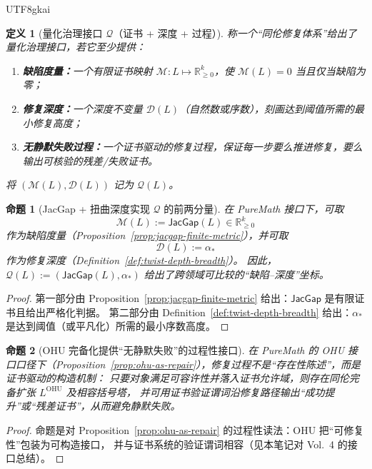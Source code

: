 \documentclass[12pt]{article}
\newtheorem{definition}{定义}[section]
\newtheorem{proposition}{命题}[section]
\newcommand{\JacGap}{\ensuremath{\mathsf{JacGap}}}
\begin{document}
\begin{CJK*}{UTF8}{gkai}
\begin{definition}[量化治理接口 $\mathcal{Q}$（证书 + 深度 + 过程）]
\label{def:quantitative-governance-interface}
称一个“同伦修复体系”给出了量化治理接口，若它至少提供：
\begin{enumerate}
  \item \textbf{缺陷度量：}一个有限证书映射 $\mathcal{M}:L\mapsto \mathbb{R}_{\ge0}^k$，使 $\mathcal{M}(L)=0$ 当且仅当缺陷为零；
  \item \textbf{修复深度：}一个深度不变量 $\mathcal{D}(L)$（自然数或序数），刻画达到阈值所需的最小修复高度；
  \item \textbf{无静默失败过程：}一个证书驱动的修复过程，保证每一步要么推进修复，要么输出可核验的残差/失败证书。
\end{enumerate}
将 $(\mathcal{M}(L),\mathcal{D}(L))$ 记为 $\mathcal{Q}(L)$。
\end{definition}

\begin{proposition}[JacGap + 扭曲深度实现 $\mathcal{Q}$ 的前两分量]
\label{prop:Q-metric-depth}
在 PureMath 接口下，可取
\[
  \mathcal{M}(L):=\JacGap(L)\in\mathbb{R}_{\ge0}^k
\]
作为缺陷度量（Proposition~\ref{prop:jacgap-finite-metric}），并可取
\[
  \mathcal{D}(L):=\alpha_\ast
\]
作为修复深度（Definition~\ref{def:twist-depth-breadth}）。
因此，$\mathcal{Q}(L):=(\JacGap(L),\alpha_\ast)$ 给出了跨领域可比较的“缺陷--深度”坐标。%
\cite{GaoZheng2025GFramework,JacGapDStructureEquiv}
\end{proposition}

\begin{proof}
第一部分由 Proposition~\ref{prop:jacgap-finite-metric} 给出：$\JacGap$ 是有限证书且给出严格化判据。
第二部分由 Definition~\ref{def:twist-depth-breadth} 给出：$\alpha_\ast$ 是达到阈值（或平凡化）所需的最小序数高度。
\end{proof}

\begin{proposition}[OHU 完备化提供“无静默失败”的过程性接口]
\label{prop:Q-failure-free}
在 PureMath 的 OHU 接口口径下（Proposition~\ref{prop:ohu-as-repair}），修复过程不是“存在性陈述”，而是证书驱动的构造机制：
只要对象满足可容许性并落入证书允许域，则存在同伦完备扩张 $L^{\mathrm{OHU}}$ 及相容括号塔，
并可用证书验证谓词沿修复路径输出“成功提升”或“残差证书”，从而避免静默失败。\cite{GaoZheng2025GFramework}
\end{proposition}

\begin{proof}
命题是对 Proposition~\ref{prop:ohu-as-repair} 的过程性读法：OHU 把“可修复性”包装为可构造接口，
并与证书系统的验证谓词相容（见本笔记对 Vol.~4 的接口总结）。
\end{proof}


\end{CJK*}
\end{document}

